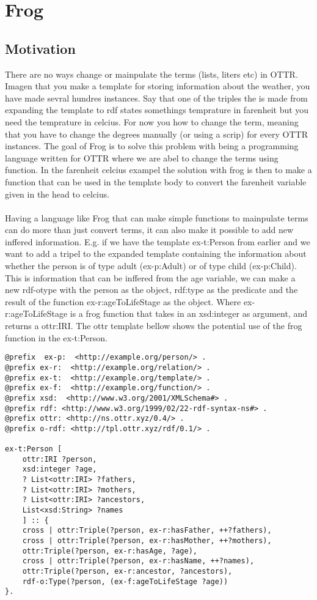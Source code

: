 \section{Frog}

\subsection{Motivation}
There are no ways change or mainpulate the terms (lists, liters etc) in OTTR. Imagen that you 
make a template for storing information about the weather, you have made sevral hundres instances. Say that one of the 
triples the is made from expanding the template to rdf states somethings temprature in farenheit but you need the temprature in celcius.
For now you how to change the term, meaning that you have to change the degrees manually (or using a scrip) for every OTTR instances.
The goal of Frog is to solve this problem with being a programming language written for OTTR where we are abel to change 
the terms using function. In the farenheit celcius exampel the solution with frog is then to make a function that can be used 
in the template body to convert the farenheit variable given in the head to celcius. 
\\ \\
Having a language like Frog that can make simple functions to mainpulate terms can do more than just convert terms, it can 
also make it possible to add new inffered information. E.g. if we have the template ex-t:Person from earlier
and we want to add a tripel to the expanded template containing the information about whether the person is of type adult (ex-p:Adult) or of type child (ex-p:Child). This 
is information that can be inffered from the age variable, we can make a new rdf-otype with the person as the object, rdf:type as the 
predicate and the result of the function ex-r:ageToLifeStage as the object. Where ex-r:ageToLifeStage is a frog function that takes in an xsd:integer
as argument, and returns a ottr:IRI. The ottr template bellow shows the potential use of the frog function in 
the ex-t:Person.

\begin{lstlisting}[frame=single]
@prefix  ex-p:  <http://example.org/person/> . 
@prefix ex-r:  <http://example.org/relation/> .
@prefix ex-t:  <http://example.org/template/> . 
@prefix ex-f:  <http://example.org/function/> .
@prefix xsd:  <http://www.w3.org/2001/XMLSchema#> . 
@prefix rdf: <http://www.w3.org/1999/02/22-rdf-syntax-ns#> .
@prefix ottr: <http://ns.ottr.xyz/0.4/> .
@prefix o-rdf: <http://tpl.ottr.xyz/rdf/0.1/> .

ex-t:Person [
    ottr:IRI ?person,
    xsd:integer ?age,
    ? List<ottr:IRI> ?fathers,
    ? List<ottr:IRI> ?mothers,
    ? List<ottr:IRI> ?ancestors,
    List<xsd:String> ?names
    ] :: {
    cross | ottr:Triple(?person, ex-r:hasFather, ++?fathers),
    cross | ottr:Triple(?person, ex-r:hasMother, ++?mothers),
    ottr:Triple(?person, ex-r:hasAge, ?age),
    cross | ottr:Triple(?person, ex-r:hasName, ++?names),
    ottr:Triple(?person, ex-r:ancestor, ?ancestors),
    rdf-o:Type(?person, (ex-f:ageToLifeStage ?age))
}.
\end{lstlisting}

